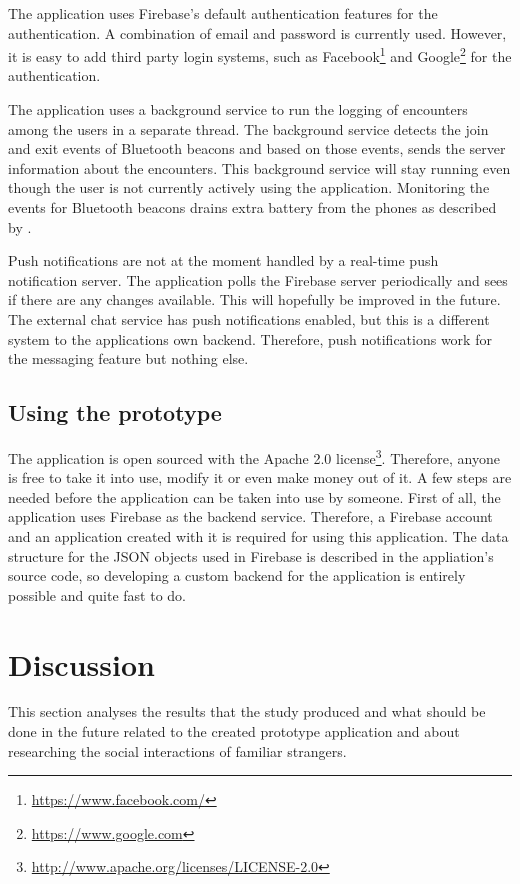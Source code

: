 The application uses Firebase's default authentication features for the authentication. A combination of email and password is currently used. However, it is easy to add third party login systems, such as Facebook\footnote{\url{https://www.facebook.com/}} and Google\footnote{\url{https://www.google.com}} for the authentication.

The application uses a background service to run the logging of encounters among the users in a separate thread. The background service detects the join and exit events of Bluetooth beacons and based on those events, sends the server information about the encounters. This background service will stay running even though the user is not currently actively using the application. Monitoring the events for Bluetooth beacons drains extra battery from the phones as described by \citep{bluetoothOverview}.

Push notifications are not at the moment handled by a real-time push notification server. The application polls the Firebase server periodically and sees if there are any changes available. This will hopefully be improved in the future. The external chat service has push notifications enabled, but this is a different system to the applications own backend. Therefore, push notifications work for the messaging feature but nothing else.

\subsection{Using the prototype}

The application is open sourced with the Apache 2.0 license\footnote{\url{http://www.apache.org/licenses/LICENSE-2.0}}. Therefore, anyone is free to take it into use, modify it or even make money out of it. A few steps are needed before the application can be taken into use by someone. First of all, the application uses Firebase as the backend service. Therefore, a Firebase account and an application created with it is required for using this application. The data structure for the JSON objects used in Firebase is described in the appliation's source code, so developing a custom backend for the application is entirely possible and quite fast to do.

\section{Discussion}

This section analyses the results that the study produced and what should be done in the future related to the created prototype application and about researching the social interactions of familiar strangers.

